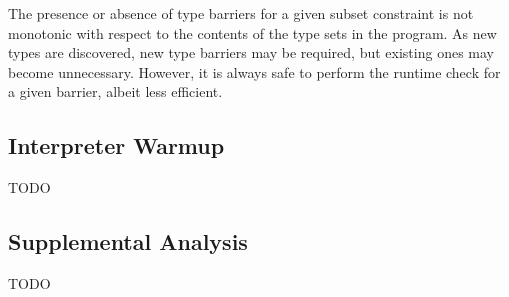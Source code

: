 The presence or absence of type barriers for a given subset constraint
is not monotonic with respect to the contents of the type sets in the program.
As new types are discovered, new type barriers may be required, but existing
ones may become unnecessary.
However, it is always safe to perform the runtime check for a given barrier,
albeit less efficient.

\subsection{Interpreter Warmup}

TODO

\subsection{Supplemental Analysis}

TODO

